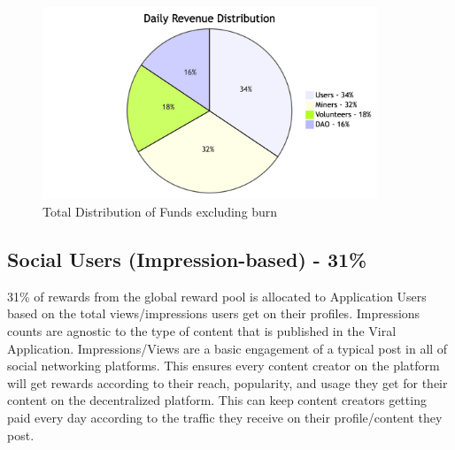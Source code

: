 \documentclass[10pt]{article}
\begin{document}
\begin{figure}[H]
\begin{center}
\includegraphics[width=10cm]{revenue-distribution}
\caption{Total Distribution of Funds excluding burn}
\end{center}
\end{figure}

\subsection{Social Users (Impression-based) - 31\%}

31\% of rewards from the global reward pool is allocated to Application Users based on the total views/impressions users get on their profiles. Impressions counts are agnostic to the type of content that is published in the Viral Application. Impressions/Views are a basic engagement of a typical post in all of social networking platforms. This ensures every content creator on the platform will get rewards according to their reach, popularity, and usage they get for their content on the decentralized platform. This can keep content creators getting paid every day according to the traffic they receive on their profile/content they post.\\
\end{document}

